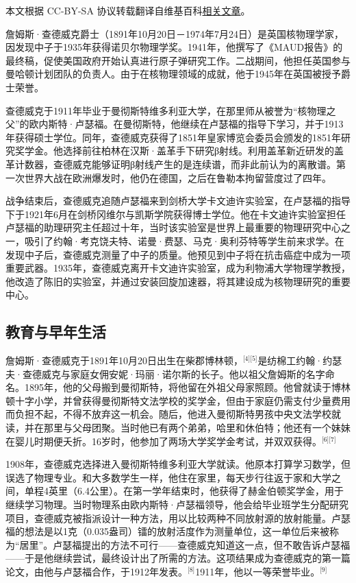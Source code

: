 
本文根据 CC-BY-SA 协议转载翻译自维基百科\href{https://en.wikipedia.org/wiki/James_Chadwick}{相关文章}。

詹姆斯·查德威克爵士（1891年10月20日－1974年7月24日）是英国核物理学家，因发现中子于1935年获得诺贝尔物理学奖。1941年，他撰写了《MAUD报告》的最终稿，促使美国政府开始认真进行原子弹研究工作。二战期间，他担任英国参与曼哈顿计划团队的负责人。由于在核物理领域的成就，他于1945年在英国被授予爵士荣誉。

查德威克于1911年毕业于曼彻斯特维多利亚大学，在那里师从被誉为“核物理之父”的欧内斯特·卢瑟福。在曼彻斯特，他继续在卢瑟福的指导下学习，并于1913年获得硕士学位。同年，查德威克获得了1851年皇家博览会委员会颁发的1851年研究奖学金。他选择前往柏林在汉斯·盖革手下研究β射线。利用盖革新近研发的盖革计数器，查德威克能够证明β射线产生的是连续谱，而非此前认为的离散谱。第一次世界大战在欧洲爆发时，他仍在德国，之后在鲁勒本拘留营度过了四年。

战争结束后，查德威克追随卢瑟福来到剑桥大学卡文迪许实验室，在卢瑟福的指导下于1921年6月在剑桥冈维尔与凯斯学院获得博士学位。他在卡文迪许实验室担任卢瑟福的助理研究主任超过十年，当时该实验室是世界上最重要的物理研究中心之一，吸引了约翰·考克饶夫特、诺曼·费瑟、马克·奥利芬特等学生前来求学。在发现中子后，查德威克测量了中子的质量。他预见到中子将在抗击癌症中成为一项重要武器。1935年，查德威克离开卡文迪许实验室，成为利物浦大学物理学教授，他改造了陈旧的实验室，并通过安装回旋加速器，将其建设成为核物理研究的重要中心。
\subsection{教育与早年生活}
詹姆斯·查德威克于1891年10月20日出生在柴郡博林顿，\(^\text{[4][5]}\)是纺棉工约翰·约瑟夫·查德威克与家庭女佣安妮·玛丽·诺尔斯的长子。他以祖父詹姆斯的名字命名。1895年，他的父母搬到曼彻斯特，将他留在外祖父母家照顾。他曾就读于博林顿十字小学，并曾获得曼彻斯特文法学校的奖学金，但由于家庭仍需支付少量费用而负担不起，不得不放弃这一机会。随后，他进入曼彻斯特男孩中央文法学校就读，并在那里与父母团聚。当时他已有两个弟弟，哈里和休伯特；他还有一个妹妹在婴儿时期便夭折。16岁时，他参加了两场大学奖学金考试，并双双获得。\(^\text{[6][7]}\)

1908年，查德威克选择进入曼彻斯特维多利亚大学就读。他原本打算学习数学，但误选了物理专业。和大多数学生一样，他住在家里，每天步行往返于家和大学之间，单程4英里（6.4公里）。在第一学年结束时，他获得了赫金伯顿奖学金，用于继续学习物理。当时物理系由欧内斯特·卢瑟福领导，他会给毕业班学生分配研究项目，查德威克被指派设计一种方法，用以比较两种不同放射源的放射能量。卢瑟福的想法是以1克（0.035盎司）镭的放射活度作为测量单位，这一单位后来被称为“居里”。卢瑟福提出的方法不可行——查德威克知道这一点，但不敢告诉卢瑟福——于是他继续尝试，最终设计出了所需的方法。这项结果成为查德威克的第一篇论文，由他与卢瑟福合作，于1912年发表。\(^\text{[8]}\)1911年，他以一等荣誉毕业。\(^\text{[9]}\)

